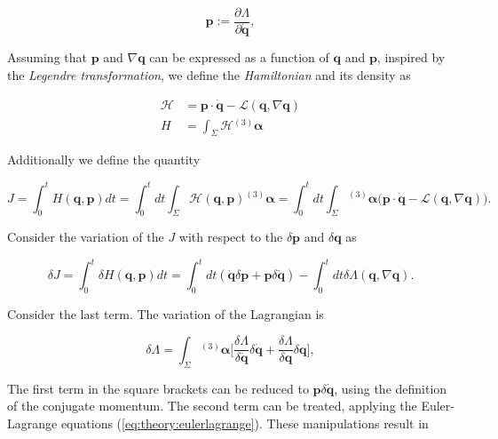 {    \begin{equation}
        \boldsymbol{p} := \frac{\partial\Lambda}{\partial\dot{\boldsymbol{q}}},
    \end{equation}
    
    Assuming that $\boldsymbol{p}$ and $\nabla\boldsymbol{q}$ can be expressed as a function of $\boldsymbol{q}$ and $\boldsymbol{p}$, inspired by the \textit{Legendre transformation}, we define the \textit{Hamiltonian} and its density as
    
    \begin{align}
        \mathcal{H} &= \boldsymbol{p}\cdot\dot{\boldsymbol{q}} - \mathcal{L}(\boldsymbol{q}, \nabla\boldsymbol{q}) \\
        H &= \int_{\Sigma}\mathcal{H}{^{(3)}\boldsymbol{\alpha}}
    \end{align}
    
    Additionally we define the quantity 
    
    \begin{equation}
        J = \int_{0}^{t}H(\boldsymbol{q},\boldsymbol{p})dt = \int_{0}^{t}dt\int_{\Sigma}\mathcal{H}(\boldsymbol{q},\boldsymbol{p}){^{(3)}\boldsymbol{\alpha}} = \int_{0}^{t}dt\int_{\Sigma}{^{(3)}\boldsymbol{\alpha}}\Big(\boldsymbol{p}\cdot\dot{\boldsymbol{q}} - \mathcal{L}(\boldsymbol{q},\nabla\boldsymbol{q})\Big).
    \end{equation}
    
    Consider the variation of the $J$ with respect to the $\delta\boldsymbol{p}$ and $\delta\boldsymbol{q}$ as
    
    \begin{equation}
        \delta J = \int_{0}^{t}\delta H(\boldsymbol{q},\boldsymbol{p})dt = \int_{0}^{t}dt (\dot{\boldsymbol{q}}\delta\boldsymbol{p}+\boldsymbol{p}\delta\dot{\boldsymbol{q}}) - \int_{0}^{t}dt\delta\Lambda(\boldsymbol{q}, \nabla\boldsymbol{q}).
    \end{equation}
    
    Consider the last term. The variation of the Lagrangian is
    
    \begin{equation}
        \delta\Lambda = \int_{\Sigma}{^{(3)}\boldsymbol{\alpha}}\Bigg[\frac{\delta\Lambda}{\delta\dot{\boldsymbol{q}}}\delta\dot{\boldsymbol{q}}+\frac{\delta\Lambda}{\delta\boldsymbol{q}}\delta\boldsymbol{q}\Bigg],
    \end{equation}
    
    The first term in the square brackets can be reduced to $\boldsymbol{p}\delta\dot{\boldsymbol{q}}$, using the definition of the conjugate momentum. 
    The second term can be treated, applying the Euler-Lagrange equations (\ref{eq:theory:eulerlagrange}). 
    These manipulations result in
    
}
